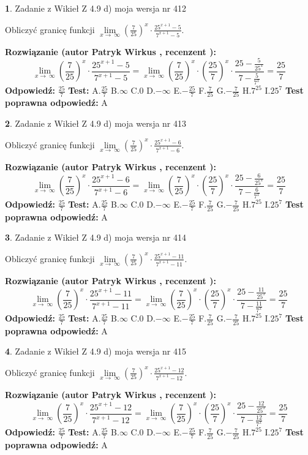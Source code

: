 \documentclass[12pt, a4paper]{article}
\theoremstyle{definition} %
\newtheorem{zad}{}
\newcommand{\zadStart}[1]{\begin{zad}#1\newline}
\newcommand{\zadStop}{\end{zad}}
\newcommand{\rozwStart}[2]{\noindent \textbf{Rozwiązanie (autor #1 , recenzent #2): }\newline}
\newcommand{\rozwStop}{\newline}
\newcommand{\odpStart}{\noindent \textbf{Odpowiedź:}\newline}
\newcommand{\odpStop}{\newline}
\newcommand{\testStart}{\noindent \textbf{Test:}\newline}
\newcommand{\testStop}{\newline}
\newcommand{\kluczStart}{\noindent \textbf{Test poprawna odpowiedź:}\newline}
\newcommand{\kluczStop}{\newline}
\begin{document}
\zadStart{Zadanie z Wikieł Z 4.9 d) moja wersja nr 412}


Obliczyć granicę funkcji  $\lim\limits_{x\to\ \infty}(\frac{7}{25})^{x}\cdot\frac{25^{x+1}-5}{7^{x+1}-5}$.
\zadStop
\rozwStart{Patryk Wirkus}{}
$$\lim\limits_{x\to\ \infty}(\frac{7}{25})^{x}\cdot\frac{25^{x+1}-5}{7^{x+1}-5}=\lim\limits_{x\to\ \infty}(\frac{7}{25})^{x}\cdot(\frac{25}{7})^{x} \cdot \frac{25-\frac{5}{25^{x}}}{7-\frac{5}{7^{x}}} = \frac{25}{7}$$
\rozwStop
\odpStart
$\frac{25}{7}$
\odpStop
\testStart
A.$\frac{25}{7}$ B.$\infty$ C.$0$ D.$-\infty$ E.$-\frac{25}{7}$
F.$\frac{7}{25}$ G.$-\frac{7}{25}$
H.$7^{25}$
I.$25^{7}$
\testStop
\kluczStart
A
\kluczStop



\zadStart{Zadanie z Wikieł Z 4.9 d) moja wersja nr 413}


Obliczyć granicę funkcji  $\lim\limits_{x\to\ \infty}(\frac{7}{25})^{x}\cdot\frac{25^{x+1}-6}{7^{x+1}-6}$.
\zadStop
\rozwStart{Patryk Wirkus}{}
$$\lim\limits_{x\to\ \infty}(\frac{7}{25})^{x}\cdot\frac{25^{x+1}-6}{7^{x+1}-6}=\lim\limits_{x\to\ \infty}(\frac{7}{25})^{x}\cdot(\frac{25}{7})^{x} \cdot \frac{25-\frac{6}{25^{x}}}{7-\frac{6}{7^{x}}} = \frac{25}{7}$$
\rozwStop
\odpStart
$\frac{25}{7}$
\odpStop
\testStart
A.$\frac{25}{7}$ B.$\infty$ C.$0$ D.$-\infty$ E.$-\frac{25}{7}$
F.$\frac{7}{25}$ G.$-\frac{7}{25}$
H.$7^{25}$
I.$25^{7}$
\testStop
\kluczStart
A
\kluczStop



\zadStart{Zadanie z Wikieł Z 4.9 d) moja wersja nr 414}


Obliczyć granicę funkcji  $\lim\limits_{x\to\ \infty}(\frac{7}{25})^{x}\cdot\frac{25^{x+1}-11}{7^{x+1}-11}$.
\zadStop
\rozwStart{Patryk Wirkus}{}
$$\lim\limits_{x\to\ \infty}(\frac{7}{25})^{x}\cdot\frac{25^{x+1}-11}{7^{x+1}-11}=\lim\limits_{x\to\ \infty}(\frac{7}{25})^{x}\cdot(\frac{25}{7})^{x} \cdot \frac{25-\frac{11}{25^{x}}}{7-\frac{11}{7^{x}}} = \frac{25}{7}$$
\rozwStop
\odpStart
$\frac{25}{7}$
\odpStop
\testStart
A.$\frac{25}{7}$ B.$\infty$ C.$0$ D.$-\infty$ E.$-\frac{25}{7}$
F.$\frac{7}{25}$ G.$-\frac{7}{25}$
H.$7^{25}$
I.$25^{7}$
\testStop
\kluczStart
A
\kluczStop



\zadStart{Zadanie z Wikieł Z 4.9 d) moja wersja nr 415}


Obliczyć granicę funkcji  $\lim\limits_{x\to\ \infty}(\frac{7}{25})^{x}\cdot\frac{25^{x+1}-12}{7^{x+1}-12}$.
\zadStop
\rozwStart{Patryk Wirkus}{}
$$\lim\limits_{x\to\ \infty}(\frac{7}{25})^{x}\cdot\frac{25^{x+1}-12}{7^{x+1}-12}=\lim\limits_{x\to\ \infty}(\frac{7}{25})^{x}\cdot(\frac{25}{7})^{x} \cdot \frac{25-\frac{12}{25^{x}}}{7-\frac{12}{7^{x}}} = \frac{25}{7}$$
\rozwStop
\odpStart
$\frac{25}{7}$
\odpStop
\testStart
A.$\frac{25}{7}$ B.$\infty$ C.$0$ D.$-\infty$ E.$-\frac{25}{7}$
F.$\frac{7}{25}$ G.$-\frac{7}{25}$
H.$7^{25}$
I.$25^{7}$
\testStop
\kluczStart
A
\kluczStop
\end{document}
